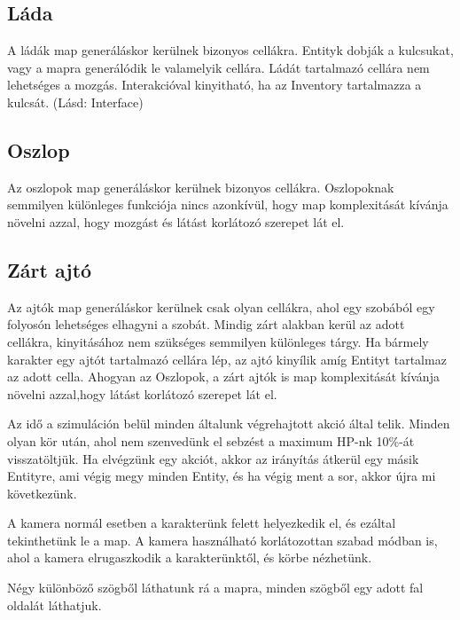 
\subsection{Láda}

A ládák map generáláskor kerülnek bizonyos cellákra.
Entityk dobják a kulcsukat, vagy a mapra generálódik le valamelyik cellára.
Ládát tartalmazó cellára nem lehetséges a mozgás.
Interakcióval kinyitható, ha az Inventory tartalmazza a kulcsát. (Lásd: Interface)

\subsection{Oszlop}

Az oszlopok map generáláskor kerülnek bizonyos cellákra.
Oszlopoknak semmilyen különleges funkciója nincs azonkívül, hogy map komplexitását kívánja növelni azzal,
hogy mozgást és látást korlátozó szerepet lát el.

\subsection{Zárt ajtó}

Az ajtók map generáláskor kerülnek csak olyan cellákra, ahol egy szobából egy folyosón lehetséges elhagyni a szobát.
Mindig zárt alakban kerül az adott cellákra, kinyitásához nem szükséges semmilyen különleges tárgy. Ha bármely karakter egy ajtót tartalmazó cellára lép, az ajtó kinyílik amíg Entityt tartalmaz az adott cella.
Ahogyan az Oszlopok, a zárt ajtók is map komplexitását kívánja növelni azzal,hogy látást korlátozó szerepet lát el.


Az idő a szimuláción belül minden általunk végrehajtott akció által telik.
Minden olyan kör után, ahol nem szenvedünk el sebzést a maximum HP-nk 10\%-át visszatöltjük.
Ha elvégzünk egy akciót, akkor az irányítás átkerül egy másik Entityre,
ami végig megy minden Entity, és ha végig ment a sor, akkor újra mi következünk.


A kamera normál esetben a karakterünk felett helyezkedik el, és ezáltal tekinthetünk le a map.
A kamera használható korlátozottan szabad módban is, ahol a kamera elrugaszkodik a karakterünktől, és körbe nézhetünk.


Négy különböző szögből láthatunk rá a mapra, minden szögből egy adott fal oldalát láthatjuk.


